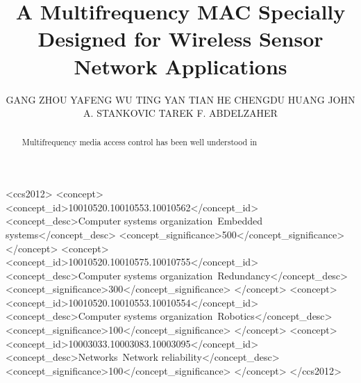 \documentclass[prodmode,acmtecs]{acmsmall} %
\begin{document}

\title{A Multifrequency MAC Specially Designed for Wireless Sensor Network Applications}
\author{GANG ZHOU
YAFENG WU
TING YAN
TIAN HE
CHENGDU HUANG
JOHN A. STANKOVIC
TAREK F. ABDELZAHER
}

\begin{abstract}
Multifrequency media access control has been well understood in
\end{abstract}


%
%
\begin{CCSXML}
<ccs2012>
 <concept>
  <concept_id>10010520.10010553.10010562</concept_id>
  <concept_desc>Computer systems organization~Embedded systems</concept_desc>
  <concept_significance>500</concept_significance>
 </concept>
 <concept>
  <concept_id>10010520.10010575.10010755</concept_id>
  <concept_desc>Computer systems organization~Redundancy</concept_desc>
  <concept_significance>300</concept_significance>
 </concept>
 <concept>
  <concept_id>10010520.10010553.10010554</concept_id>
  <concept_desc>Computer systems organization~Robotics</concept_desc>
  <concept_significance>100</concept_significance>
 </concept>
 <concept>
  <concept_id>10003033.10003083.10003095</concept_id>
  <concept_desc>Networks~Network reliability</concept_desc>
  <concept_significance>100</concept_significance>
 </concept>
</ccs2012>  
\end{CCSXML}

\end{document}
